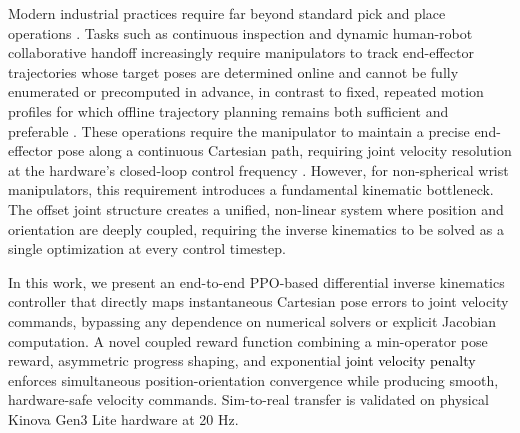 \documentclass[preprint,12pt]{elsarticle}
\begin{document}
Modern industrial practices require far beyond standard pick and place operations \cite{intro_4}. Tasks such as continuous inspection and dynamic human-robot collaborative handoff increasingly require manipulators to track end-effector trajectories whose target poses are determined online and cannot be fully enumerated or precomputed in advance, in contrast to fixed, repeated motion profiles for which offline trajectory planning remains both sufficient and preferable \cite{11358968}. These operations require the manipulator to maintain a precise end-effector pose along a continuous Cartesian path, requiring joint velocity resolution at the hardware's closed-loop control frequency \cite{intro_6, intro_7}. However, for non-spherical wrist manipulators, this requirement introduces a fundamental kinematic bottleneck. The offset joint structure creates a unified, non-linear system where position and orientation are deeply coupled, requiring the inverse kinematics to be solved as a single optimization at every control timestep.

In this work, we present an end-to-end PPO-based differential inverse kinematics controller that directly maps instantaneous Cartesian pose errors to joint velocity commands, bypassing any dependence on numerical solvers or explicit Jacobian computation. A novel coupled reward function combining a min-operator pose reward, asymmetric progress shaping, and exponential \textcolor{black}{joint velocity penalty} enforces simultaneous position-orientation convergence while producing smooth, hardware-safe velocity commands. Sim-to-real transfer is validated on physical Kinova Gen3 Lite hardware at 20 Hz.
\end{document}
